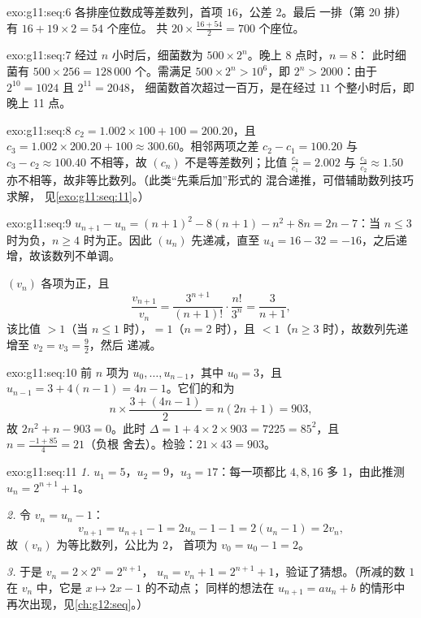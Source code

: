 \begin{solution}{exo:g11:seq:6}
各排座位数成等差数列，首项 $16$，公差 $2$。最后
一排（第 20 排）有 $16 + 19 \times 2 = 54$ 个座位。
共 $20 \times \frac{16 + 54}{2} = 700$ 个座位。
\end{solution}

\begin{solution}{exo:g11:seq:7}
经过 $n$ 小时后，细菌数为 $500 \times 2^n$。晚上 8 点时，$n = 8$：
此时细菌有 $500 \times 256 = 128\,000$ 个。需满足 $500 \times 2^n >
10^6$，即 $2^n > 2000$：由于 $2^{10} = 1024$ 且 $2^{11} = 2048$，
细菌数首次超过一百万，是在经过 $11$ 个整小时后，即晚上 11 点。
\end{solution}

\begin{solution}{exo:g11:seq:8}
$c_2 = 1.002 \times 100 + 100 = 200.20$，且
$c_3 = 1.002 \times 200.20 + 100 \approx 300.60$。相邻两项之差
$c_2 - c_1 = 100.20$ 与 $c_3 - c_2 \approx 100.40$ 不相等，故
$(c_n)$ 不是等差数列；比值 $\frac{c_2}{c_1} = 2.002$ 与
$\frac{c_3}{c_2} \approx 1.50$ 亦不相等，故非等比数列。（此类“先乘后加”形式的
混合递推，可借辅助数列技巧求解，
见\cref{exo:g11:seq:11}。）
\end{solution}

\begin{solution}{exo:g11:seq:9}
$u_{n+1} - u_n = (n+1)^2 - 8(n+1) - n^2 + 8n = 2n - 7$：当
$n \leq 3$ 时为负，$n \geq 4$ 时为正。因此 $(u_n)$ 先递减，直至
$u_4 = 16 - 32 = -16$，之后递增，故该数列不单调。

$(v_n)$ 各项为正，且
\[
\frac{v_{n+1}}{v_n} = \frac{3^{n+1}}{(n+1)!} \cdot \frac{n!}{3^n}
= \frac{3}{n+1},
\]
该比值 $> 1$（当 $n \leq 1$ 时），$= 1$（$n = 2$ 时），且
$< 1$（$n \geq 3$ 时），故数列先递增至 $v_2 = v_3 = \frac92$，然后
递减。
\end{solution}

\begin{solution}{exo:g11:seq:10}
前 $n$ 项为 $u_0, \dots, u_{n-1}$，其中 $u_0 = 3$，且
$u_{n-1} = 3 + 4(n-1) = 4n - 1$。它们的和为
\[
n \times \frac{3 + (4n-1)}{2} = n(2n + 1) = 903,
\]
故 $2n^2 + n - 903 = 0$。此时 $\Delta = 1 + 4 \times 2 \times 903 =
7225 = 85^2$，且 $n = \frac{-1 + 85}{4} = 21$（负根
舍去）。检验：$21 \times 43 = 903$。
\end{solution}

\begin{solution}{exo:g11:seq:11}
\emph{1.} $u_1 = 5$，$u_2 = 9$，$u_3 = 17$：每一项都比
$4, 8, 16$ 多 1，由此推测 $u_n = 2^{n+1} + 1$。

\emph{2.} 令 $v_n = u_n - 1$：
\[
v_{n+1} = u_{n+1} - 1 = 2u_n - 1 - 1 = 2(u_n - 1) = 2v_n,
\]
故 $(v_n)$ 为等比数列，公比为 $2$，
首项为 $v_0 = u_0 - 1 = 2$。

\emph{3.} 于是 $v_n = 2 \times 2^n = 2^{n+1}$，
$u_n = v_n + 1 = 2^{n+1} + 1$，验证了猜想。（所减的数 $1$
在 $v_n$ 中，它是 $x \mapsto 2x - 1$ 的不动点；
同样的想法在 $u_{n+1} = au_n + b$ 的情形中再次出现，见\cref{ch:g12:seq}。）
\end{solution}

